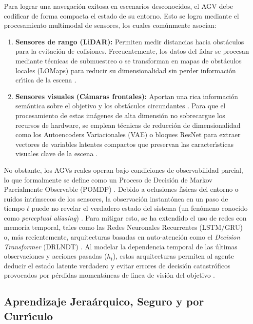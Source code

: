 Para lograr una navegaci\'{o}n exitosa en escenarios desconocidos, el AGV debe codificar de forma compacta el estado de su entorno. Esto se logra mediante el procesamiento multimodal de sensores, los cuales com\'{u}nmente asocian:
\begin{enumerate}
    \item \textbf{Sensores de rango (LiDAR):} Permiten medir distancias hacia obst\'{a}culos para la evitaci\'{o}n de colisiones. Frecuentemente, los datos del l\'{\i}dar se procesan mediante t\'{e}cnicas de submuestreo o se transforman en mapas de obst\'{a}culos locales (LOMaps) para reducir su dimensionalidad sin perder informaci\'{o}n cr\'{\i}tica de la escena \cite{Gao2025}.
    \item \textbf{Sensores visuales (C\'{a}maras frontales):} Aportan una rica informaci\'{o}n sem\'{a}ntica sobre el objetivo y los obst\'{a}culos circundantes \cite{Xue2022}. Para que el procesamiento de estas im\'{a}genes de alta dimensi\'{o}n no sobrecargue los recursos de hardware, se emplean t\'{e}cnicas de reducci\'{o}n de dimensionalidad como los Autoencoders Variacionales (VAE) o bloques ResNet para extraer vectores de variables latentes compactos que preservan las caracter\'{\i}sticas visuales clave de la escena \cite{Xue2022, Ge2024}.
\end{enumerate}

No obstante, los AGVs reales operan bajo condiciones de observabilidad parcial, lo que formalmente se define como un Proceso de Decisi\'{o}n de Markov Parcialmente Observable (POMDP) \cite{Gao2025, Ge2024}. Debido a oclusiones f\'{\i}sicas del entorno o ruidos intr\'{\i}nsecos de los sensores, la observaci\'{o}n instant\'{o}nea en un paso de tiempo $t$ puede no revelar el verdadero estado del sistema (un fenómeno conocido como \textit{perceptual aliasing}) \cite{RLOverview}. Para mitigar esto, se ha extendido el uso de redes con memoria temporal, tales como las Redes Neuronales Recurrentes (LSTM/GRU) o, m\'{a}s recientemente, arquitecturas basadas en auto-atenci\'{o}n como el \textit{Decision Transformer} (DRLNDT) \cite{Ge2024}. Al modelar la dependencia temporal de las \'{u}ltimas observaciones y acciones pasadas ($h_t$), estas arquitecturas permiten al agente deducir el estado latente verdadero y evitar errores de decisi\'{o}n catastr\'{o}ficos provocados por p\'{e}rdidas moment\'{a}neas de l\'{\i}nea de visi\'{o}n del objetivo \cite{Ge2024}.

\subsection{Aprendizaje Jera\'{a}rquico, Seguro y por Curr\'{\i}culo}

